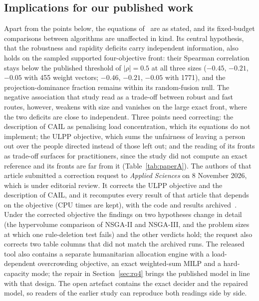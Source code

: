 \documentclass[systems,article,submit,moreauthors,pdftex]{Definitions/mdpi}
\begin{document}
\subsection{Implications for our published work}\label{sec:implications}
Apart from the points below, the equations of~\cite{rabiei2026resilient} are as stated, and its
fixed-budget comparisons between algorithms are unaffected in kind. Its central hypothesis,
that the robustness and rapidity deficits carry independent information, also holds on the
sampled supported four-objective front: their Spearman correlation stays below the published
threshold of $|\rho| = 0.5$ at all three sizes ($-0.45$, $-0.21$, $-0.05$ with 455 weight
vectors; $-0.46$, $-0.21$, $-0.05$ with 1771), and the projection-dominance fraction remains
within its random-fusion null. The negative association that study read as a trade-off
between robust and fast routes, however, weakens with size and vanishes on the large exact
front, where the two deficits are close to independent. Three points need correcting: the
description of CAIL as penalising load concentration, which its equations do not implement; the
ULPP objective, which sums the unfairness of leaving a person out over the people directed
instead of those left out; and the
reading of its fronts as trade-off surfaces for practitioners, since the study did not compute an
exact reference and its fronts are far from it (Table~\ref{tab:paperA}). The authors of that
article submitted a correction request to \emph{Applied Sciences} on 8 November 2026, which is
under editorial review. It corrects the ULPP objective and the description of CAIL, and it
recomputes every result of that article that depends on the objective (CPU times are kept), with
the code and results archived~\cite{rabiei2026correctionarchive}. Under the corrected objective
the findings on two hypotheses change in detail (the hypervolume comparison of NSGA-II and
NSGA-III, and the problem sizes at which one rule-deletion test fails) and the other verdicts
hold; the request also corrects two table
columns that did not match the archived runs. The released tool also contains a separate humanitarian allocation
engine with a load-dependent overcrowding objective, an exact weighted-sum MILP and a
hard-capacity mode; the repair in Section~\ref{sec:rq4} brings the published model in line with
that design. The open artefact contains the exact decider and the repaired model, so readers of
the earlier study can reproduce both readings side by side.
\end{document}
